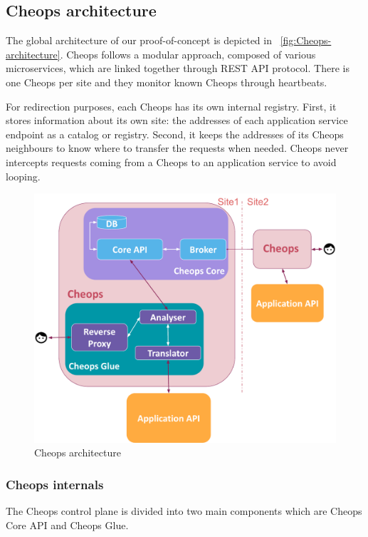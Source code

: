 \subsection{Cheops architecture}
\label{ssec:cheops-archi}



The global architecture of our proof-of-concept is depicted in
~\autoref{fig:Cheops-architecture}.
%
Cheops follows a modular approach, composed of various microservices,
which are linked together through REST API protocol.
%
There is one Cheops per site and they monitor known Cheops
through heartbeats.

For redirection purposes, each Cheops has its own internal registry.
%
First, it stores information about its own site: the addresses of each
application service endpoint as a catalog or registry.
%
Second, it keeps the addresses of its Cheops neighbours to know where
to transfer the requests when needed.
%
%
Cheops never intercepts requests coming from a Cheops to an
application service to avoid looping.


\begin{figure}[hbtp]
  \centering
  \includegraphics[width=.75\linewidth]{figs/pdf/cheops-architecture}
  \caption{Cheops architecture}
  \label{fig:Cheops-architecture}
\end{figure}
%

\subsubsection{Cheops internals}
%
The Cheops control plane is divided into two main components which are
Cheops Core API and Cheops Glue.

